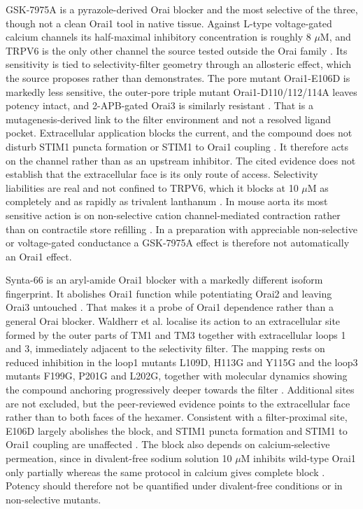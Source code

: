 GSK-7975A is a pyrazole-derived Orai blocker and the most selective of the three, though not a clean Orai1 tool in native tissue. Against L-type voltage-gated calcium channels its half-maximal inhibitory concentration is roughly 8 \ensuremath{\mu}M, and TRPV6 is the only other channel the source tested outside the Orai family \cite{ref070}. Its sensitivity is tied to selectivity-filter geometry through an allosteric effect, which the source proposes rather than demonstrates. The pore mutant Orai1-E106D is markedly less sensitive, the outer-pore triple mutant Orai1-D110/112/114A leaves potency intact, and 2-APB-gated Orai3 is similarly resistant \cite{ref070}. That is a mutagenesis-derived link to the filter environment and not a resolved ligand pocket. Extracellular application blocks the current, and the compound does not disturb STIM1 puncta formation or STIM1 to Orai1 coupling \cite{ref070}. It therefore acts on the channel rather than as an upstream inhibitor. The cited evidence does not establish that the extracellular face is its only route of access. Selectivity liabilities are real and not confined to TRPV6, which it blocks at 10 \ensuremath{\mu}M as completely and as rapidly as trivalent lanthanum \cite{ref070}. In mouse aorta its most sensitive action is on non-selective cation channel-mediated contraction rather than on contractile store refilling \cite{ref041}. In a preparation with appreciable non-selective or voltage-gated conductance a GSK-7975A effect is therefore not automatically an Orai1 effect.

Synta-66 is an aryl-amide Orai1 blocker with a markedly different isoform fingerprint. It abolishes Orai1 function while potentiating Orai2 and leaving Orai3 untouched \cite{ref093}. That makes it a probe of Orai1 dependence rather than a general Orai blocker. Waldherr et al. localise its action to an extracellular site formed by the outer parts of TM1 and TM3 together with extracellular loops 1 and 3, immediately adjacent to the selectivity filter. The mapping rests on reduced inhibition in the loop1 mutants L109D, H113G and Y115G and the loop3 mutants F199G, P201G and L202G, together with molecular dynamics showing the compound anchoring progressively deeper towards the filter \cite{ref071}. Additional sites are not excluded, but the peer-reviewed evidence points to the extracellular face rather than to both faces of the hexamer. Consistent with a filter-proximal site, E106D largely abolishes the block, and STIM1 puncta formation and STIM1 to Orai1 coupling are unaffected \cite{ref071}. The block also depends on calcium-selective permeation, since in divalent-free sodium solution 10 \ensuremath{\mu}M inhibits wild-type Orai1 only partially whereas the same protocol in calcium gives complete block \cite{ref071}. Potency should therefore not be quantified under divalent-free conditions or in non-selective mutants.

